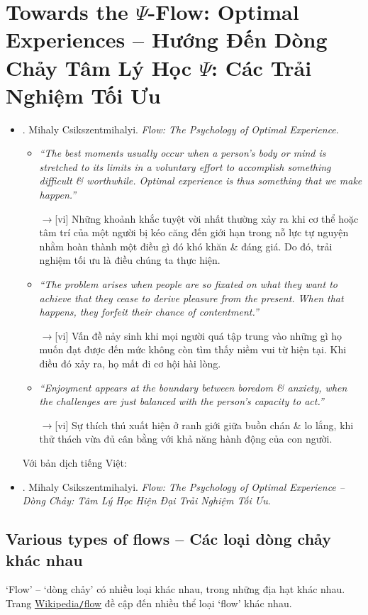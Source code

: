 \documentclass[12pt,oneside]{book}
\begin{document}
\chapter{Towards the $\Psi$-Flow: Optimal Experiences -- Hướng Đến Dòng Chảy Tâm Lý Học $\Psi$: Các Trải Nghiệm Tối Ưu}
\minitoc
{}
\begin{itemize}
	\item \cite{Csikszentmihalyi_flow}. {\sc Mihaly Csikszentmihalyi}. {\it Flow: The Psychology of Optimal Experience}.
	\begin{itemize}
		\item {\it``The best moments usually occur when a person's body or mind is stretched to its limits in a voluntary effort to accomplish something difficult \& worthwhile. Optimal experience is thus something that we make happen.''}
		
		{\sf[en]$\to$[vi]} Những khoảnh khắc tuyệt vời nhất thường xảy ra khi cơ thể hoặc tâm trí của một người bị kéo căng đến giới hạn trong nỗ lực tự nguyện nhằm hoàn thành một điều gì đó khó khăn \& đáng giá. Do đó, trải nghiệm tối ưu là điều chúng ta thực hiện.
		
		\item {\it``The problem arises when people are so fixated on what they want to achieve that they cease to derive pleasure from the present. When that happens, they forfeit their chance of contentment.''}
		
		{\sf[en]$\to$[vi]} Vấn đề nảy sinh khi mọi người quá tập trung vào những gì họ muốn đạt được đến mức không còn tìm thấy niềm vui từ hiện tại. Khi điều đó xảy ra, họ mất đi cơ hội hài lòng.
		
		\item {\it``Enjoyment appears at the boundary between boredom \& anxiety, when the challenges are just balanced with the person's capacity to act.''}
		
		{\sf[en]$\to$[vi]} Sự thích thú xuất hiện ở ranh giới giữa buồn chán \& lo lắng, khi thử thách vừa đủ cân bằng với khả năng hành động của con người.		
	\end{itemize}
	Với bản dịch tiếng Việt:
	\item \cite{Csikszentmihalyi_flow_VN}. {\sc Mihaly Csikszentmihalyi}. {\it Flow: The Psychology of Optimal Experience -- Dòng Chảy: Tâm Lý Học Hiện Đại Trải Nghiệm Tối Ưu}.
\end{itemize}

\section{Various types of flows -- Các loại dòng chảy khác nhau}
`Flow' -- `dòng chảy' có nhiều loại khác nhau, trong những địa hạt khác nhau. Trang \href{https://en.wikipedia.org/wiki/Flow}{Wikipedia{\tt/}flow} đề cập đến nhiều thể loại `flow' khác nhau.
\end{document}
